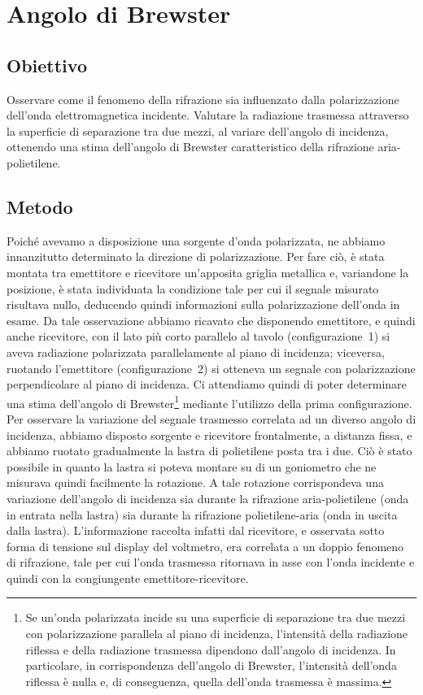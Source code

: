 \documentclass[a4paper]{article}
\begin{document}
\section{Angolo di Brewster}
\subsection{Obiettivo}
Osservare come il fenomeno della rifrazione sia influenzato dalla polarizzazione dell'onda elettromagnetica incidente. Valutare la radiazione trasmessa attraverso la superficie di separazione tra due mezzi, al variare dell'angolo di incidenza, ottenendo una stima dell'angolo di Brewster caratteristico della rifrazione aria-polietilene. 

\subsection{Metodo}
Poiché avevamo a disposizione una sorgente d'onda polarizzata, ne abbiamo innanzitutto determinato la direzione di polarizzazione. Per fare ciò, è stata montata tra emettitore e ricevitore un'apposita griglia metallica e, variandone la posizione, è stata individuata la condizione tale per cui il segnale misurato risultava nullo, deducendo quindi informazioni sulla polarizzazione dell'onda in esame. Da tale osservazione abbiamo ricavato che disponendo emettitore, e quindi anche ricevitore, con il lato più corto parallelo al tavolo (configurazione~1) si aveva radiazione polarizzata parallelamente al piano di incidenza; viceversa, ruotando l'emettitore (configurazione~2) si otteneva un segnale con polarizzazione perpendicolare al piano di incidenza. Ci attendiamo quindi di poter determinare una stima dell'angolo di Brewster\footnote{Se un'onda polarizzata incide su una superficie di separazione tra due mezzi con polarizzazione parallela al piano di incidenza, l'intensità della radiazione riflessa e della radiazione trasmessa dipendono dall'angolo di incidenza. In particolare, in corrispondenza dell'angolo di Brewster, l'intensità dell'onda riflessa è nulla e, di conseguenza, quella dell'onda trasmessa è massima.} mediante l'utilizzo della prima configurazione.
Per osservare la variazione del segnale trasmesso correlata ad un diverso angolo di incidenza, abbiamo disposto sorgente e ricevitore frontalmente, a distanza fissa, e abbiamo ruotato gradualmente la lastra di polietilene posta tra i due. Ciò è stato possibile in quanto la lastra si poteva montare su di un goniometro che ne misurava quindi facilmente la rotazione. A tale rotazione corrispondeva una variazione dell'angolo di incidenza sia durante la rifrazione aria-polietilene (onda in entrata nella lastra) sia durante la rifrazione polietilene-aria (onda in uscita dalla lastra). L'informazione raccolta infatti dal ricevitore, e osservata sotto forma di tensione sul display del voltmetro, era correlata a un doppio fenomeno di rifrazione, tale per cui l'onda trasmessa ritornava in asse con l'onda incidente e quindi con la congiungente emettitore-ricevitore. 
\end{document}
